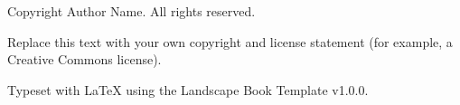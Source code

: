 \begin{widepage}
\thispagestyle{empty}
\null\vfill
\begingroup
\small
\noindent Copyright \textcopyright{} \the\year{} Author Name. All rights reserved.
\par\medskip
\noindent Replace this text with your own copyright and license statement
(for example, a Creative Commons license).
\par\medskip
\noindent Typeset with \LaTeX{} using the Landscape Book Template v1.0.0.
\endgroup
\end{widepage}
